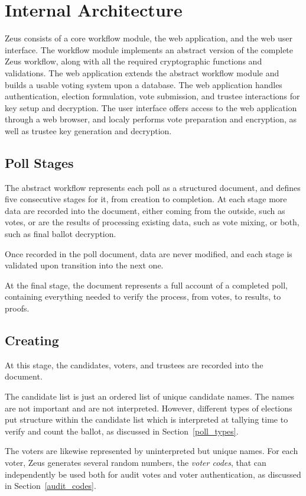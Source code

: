 \documentclass[letterpaper,10pt]{article}
\begin{document}
\section{Internal Architecture}
\label{architecture}

Zeus consists of a core workflow module, the web application,
and the web user interface.
The workflow module implements an abstract version of the complete Zeus
workflow, along with all the required cryptographic functions and
validations. The web application extends the abstract workflow module
and builds a usable voting system upon a database.
The web application handles authentication, election formulation, vote
submission, and trustee interactions for key setup and decryption.
The user interface offers access to the web application through
a web browser, and localy performs vote preparation and encryption,
as well as trustee key generation and decryption.

\subsection{Poll Stages}
The abstract workflow represents each poll as a structured document,
and defines five consecutive stages for it, from creation to completion.
At each stage more data are recorded into the document,
either coming from the outside, such as votes,
or are the results of processing existing data, such as vote mixing,
or both, such as final ballot decryption.

Once recorded in the poll document, data are never modified,
and each stage is validated upon transition into the next one.

At the final stage,
the document represents a full account of a completed poll,
containing everything needed to verify the process,
from votes, to results, to proofs.

\subsection{Creating}
At this stage, the candidates, voters, and trustees are recorded
into the document.

The candidate list is just an ordered list of unique candidate names.
The names are not important and are not interpreted. However,
different types of elections put structure within the candidate list
which is interpreted at tallying time to verify and count the ballot,
as discussed in Section~\ref{poll_types}.

The voters are likewise represented by uninterpreted but unique names.
For each voter,
Zeus generates several random numbers, the \emph{voter codes}, that can
independently be used both for audit votes and voter authentication,
as discussed in Section~\ref{audit_codes}.
\end{document}
